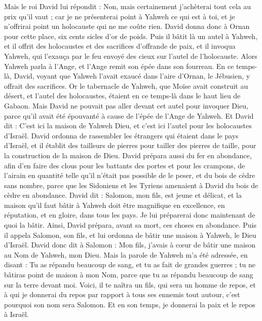 \begin{multicols}{2}
Mais le roi David lui répondit : Non, mais certainement j'achèterai tout cela au prix qu'il vaut ; car je ne présenterai point à Yahweh ce qui est à toi, et je n'offrirai point un holocauste qui ne me coûte rien.
David donna donc à Ornan pour cette place, six cents sicles d'or de poids.
Puis il bâtit là un autel à Yahweh, et il offrit des holocaustes et des sacrifices d’offrande de paix, et il invoqua Yahweh, qui l'exauça par le feu envoyé des cieux sur l'autel de l'holocauste.
Alors Yahweh parla à l'Ange, et l'Ange remit son épée dans son fourreau.
En ce temps-là, David, voyant que Yahweh l'avait exaucé dans l'aire d'Ornan, le Jébusien, y offrait des sacrifices.
Or le tabernacle de Yahweh, que Moïse avait construit au désert, et l'autel des holocaustes, étaient en ce temps-là dans le haut lieu de Gabaon.
Mais David ne pouvait pas aller devant cet autel pour invoquer Dieu, parce qu'il avait été épouvanté à cause de l'épée de l'Ange de Yahweh.
\VerseOne{}Et David dit : C'est ici la maison de Yahweh Dieu, et c'est ici l'autel pour les holocaustes d'Israël.
David ordonna de rassembler les étrangers qui étaient dans le pays d'Israël, et il établit des tailleurs de pierres pour tailler des pierres de taille, pour la construction de la maison de Dieu.
David prépara aussi du fer en abondance, afin d'en faire des clous pour les battants des portes et pour les crampons,  de l’airain en quantité telle qu’il n’était pas possible de le peser,
et du bois de cèdre sans nombre, parce que les Sidoniens et les Tyriens amenaient à David du bois de cèdre en abondance.
David dit : Salomon, mon fils, est jeune et délicat, et la maison qu'il faut bâtir à Yahweh doit être magnifique en excellence, en réputation, et en gloire, dans tous les pays. Je lui préparerai donc maintenant de quoi la bâtir. Ainsi, David prépara, avant sa mort, ces choses en abondance.
Puis il appela Salomon, son fils, et lui ordonna de bâtir une maison à Yahweh, le Dieu d'Israël.
David donc dit à Salomon : Mon fils, j’avais à cœur de bâtir une maison au Nom de Yahweh, mon Dieu.
Mais la parole de Yahweh m'a été adressée, en disant : Tu as répandu beaucoup de sang, et tu as fait de grandes guerres ; tu ne bâtiras point de maison à mon Nom, parce que tu as répandu beaucoup de sang sur la terre devant moi.
Voici, il te naîtra un fils, qui sera un homme de repos,  et à qui je donnerai du repos par rapport à tous ses ennemis tout autour, c'est pourquoi son nom sera Salomon. Et en son temps, je donnerai la paix et le repos à Israël.

\end{multicols}
